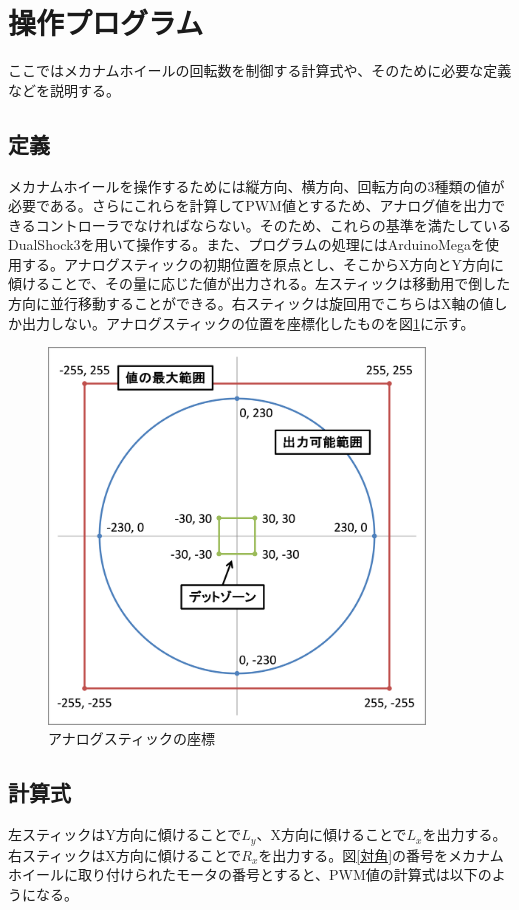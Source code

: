 \documentclass[12pt,oneside]{sotsuken_paper}
\begin{document}
	\section{操作プログラム}
	ここではメカナムホイールの回転数を制御する計算式や、そのために必要な定義などを説明する。

		\subsection{定義}
		メカナムホイールを操作するためには縦方向、横方向、回転方向の3種類の値が必要である。さらにこれらを計算してPWM値とするため、アナログ値を出力できるコントローラでなければならない。そのため、これらの基準を満たしているDualShock3を用いて操作する。また、プログラムの処理にはArduinoMegaを使用する。アナログスティックの初期位置を原点とし、そこからX方向とY方向に傾けることで、その量に応じた値が出力される。左スティックは移動用で倒した方向に並行移動することができる。右スティックは旋回用でこちらはX軸の値しか出力しない。アナログスティックの位置を座標化したものを図\ref{座標}に示す。

		\begin{figure}[htp]
			\begin{center}
				\includegraphics[width=100mm]{Image/座標.png}
				\caption{アナログスティックの座標}
				\label{座標}
			\end{center}
		\end{figure}

		\subsection{計算式}
		左スティックはY方向に傾けることで$L_y$、X方向に傾けることで$L_x$を出力する。右スティックはX方向に傾けることで$R_x$を出力する。図\ref{対角}の番号をメカナムホイールに取り付けられたモータの番号とすると、PWM値の計算式は以下のようになる。
\end{document}
